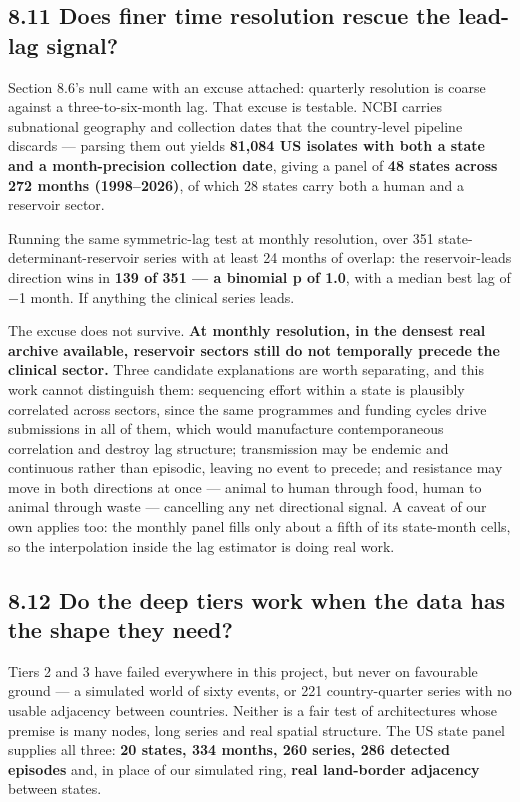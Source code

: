 \documentclass[11pt,a4paper]{article}
\begin{document}
\subsection*{8.11 Does finer time resolution rescue the lead-lag signal?}

Section 8.6's null came with an excuse attached: quarterly resolution is coarse against a three-to-six-month lag. That excuse is testable. NCBI carries subnational geography and collection dates that the country-level pipeline discards — parsing them out yields \textbf{81,084 US isolates with both a state and a month-precision collection date}, giving a panel of \textbf{48 states across 272 months (1998–2026)}, of which 28 states carry both a human and a reservoir sector.

Running the same symmetric-lag test at monthly resolution, over 351 state-determinant-reservoir series with at least 24 months of overlap: the reservoir-leads direction wins in \textbf{139 of 351 — a binomial p of 1.0}, with a median best lag of −1 month. If anything the clinical series leads.

The excuse does not survive. \textbf{At monthly resolution, in the densest real archive available, reservoir sectors still do not temporally precede the clinical sector.} Three candidate explanations are worth separating, and this work cannot distinguish them: sequencing effort within a state is plausibly correlated across sectors, since the same programmes and funding cycles drive submissions in all of them, which would manufacture contemporaneous correlation and destroy lag structure; transmission may be endemic and continuous rather than episodic, leaving no event to precede; and resistance may move in both directions at once — animal to human through food, human to animal through waste — cancelling any net directional signal. A caveat of our own applies too: the monthly panel fills only about a fifth of its state-month cells, so the interpolation inside the lag estimator is doing real work.

\subsection*{8.12 Do the deep tiers work when the data has the shape they need?}

Tiers 2 and 3 have failed everywhere in this project, but never on favourable ground — a simulated world of sixty events, or 221 country-quarter series with no usable adjacency between countries. Neither is a fair test of architectures whose premise is many nodes, long series and real spatial structure. The US state panel supplies all three: \textbf{20 states, 334 months, 260 series, 286 detected episodes} and, in place of our simulated ring, \textbf{real land-border adjacency} between states.
\end{document}
